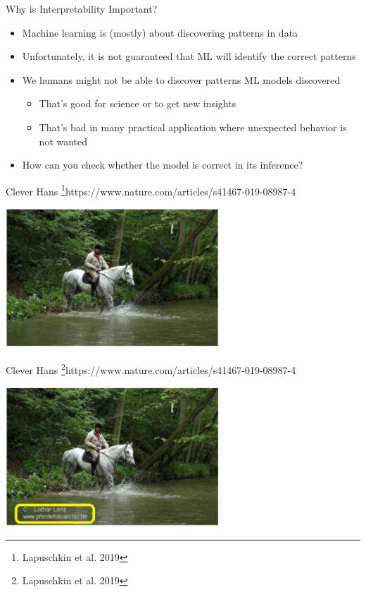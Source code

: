 \documentclass[11pt,compress,t,notes=noshow, xcolor=table]{beamer}
\begin{document}
\begin{vbframe}{Why is Interpretability Important?}
	
	\begin{itemize}
	    \item Machine learning is (mostly) about discovering patterns in data
	    \item Unfortunately, it is not guaranteed that ML will identify the correct patterns
	    
	    \medskip
	    \item We humans might not be able to discover patterns ML models discovered
	    \begin{itemize}
	        \item That's good for science or to get new insights
	        \item That's bad in many practical application where unexpected behavior is not wanted
	    \end{itemize}
	    \medskip
	    
	    \item \alert{How can you check whether the model is correct in its inference?}
	\end{itemize}
	
\end{vbframe}

\begin{vbframe}{Clever Hans \footnote{Lapuschkin et al. 2019}{https://www.nature.com/articles/s41467-019-08987-4}}
	
	\centering
	\includegraphics[width=0.6\textwidth]{figure/horse_without_label.PNG}
	
\end{vbframe}

\begin{vbframe}{Clever Hans \footnote{Lapuschkin et al. 2019}{https://www.nature.com/articles/s41467-019-08987-4}}
	
	\centering
	\includegraphics[width=0.6\textwidth]{figure/horse_with_label.PNG}
	
\end{vbframe}
\end{document}
